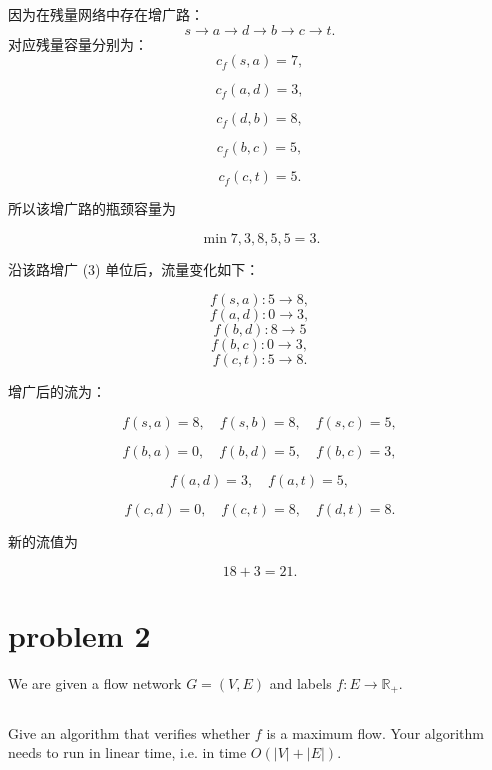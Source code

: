 \documentclass[12pt,a4paper]{article}
\begin{document}
\begin{answerbox}
因为在残量网络中存在增广路：
$$
s\to a\to d\to b\to c\to t.
$$
对应残量容量分别为：
$$
c_f(s,a)=7,
$$

$$
c_f(a,d)=3,
$$

$$
c_f(d,b)=8,
$$

$$
c_f(b,c)=5,
$$

$$
c_f(c,t)=5.
$$

所以该增广路的瓶颈容量为

\[
\min{7,3,8,5,5}=3.
\]

沿该路增广 (3) 单位后，流量变化如下：

\[
f(s,a):5\to 8,
\]
\[
f(a,d):0\to 3,
\]
\[
f(b,d):8\to 5
\]
\[
f(b,c):0\to 3,
\]
\[
f(c,t):5\to 8.
\]

增广后的流为：

\[
f(s,a)=8,\quad f(s,b)=8,\quad f(s,c)=5,
\]

\[
f(b,a)=0,\quad f(b,d)=5,\quad f(b,c)=3,
\]

\[
f(a,d)=3,\quad f(a,t)=5,
\]

\[
f(c,d)=0,\quad f(c,t)=8,\quad f(d,t)=8.
\]

新的流值为

\[
18+3=\boxed{21}.
\]

\end{answerbox}

\section{problem 2}

  We are given a flow network $G=(V,E)$ and labels $f:E\to \mathbb{R}_+$.


\subsection{}

 Give an algorithm that verifies whether $f$ is a maximum flow. Your algorithm needs to run in linear time, i.e. in time $O(|V|+|E|)$.
\end{document}
